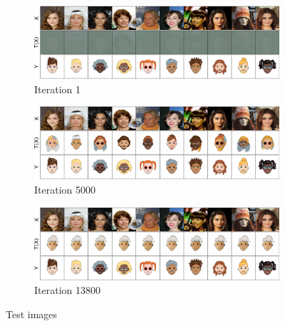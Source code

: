 \documentclass[11pt]{article}
\begin{document}
\begin{figure}[htp!]
    \centering
    \begin{subfigure}{\textwidth}
        \centering
        \includegraphics[scale=.18]{figures/media_images_Fixed Images_0_a56284c48d003ecfb6cd.png}
        \caption{Iteration 1}
        \label{fig:test_images_real_iter_1}
    \end{subfigure}%

    \bigskip

    \begin{subfigure}{\textwidth}
        \centering
        \includegraphics[scale=.18]{figures/media_images_Fixed Images_5000_0043c7527d827202e7ad.png}
        \caption{Iteration 5000}
        \label{fig:test_images_real_iter_med}
    \end{subfigure}%

    \bigskip

    \begin{subfigure}{\textwidth}
        \centering
        \includegraphics[scale=.18]{figures/media_images_Fixed Images_13800_653d5de40c4ba6a777ca.png}
        \caption{Iteration 13800}
        \label{fig:test_images_real_iter_last}
    \end{subfigure}%
    \bigskip
    \caption{Test images}
    \label{fig:test_samples_large_scale}
\end{figure}
\end{document}
